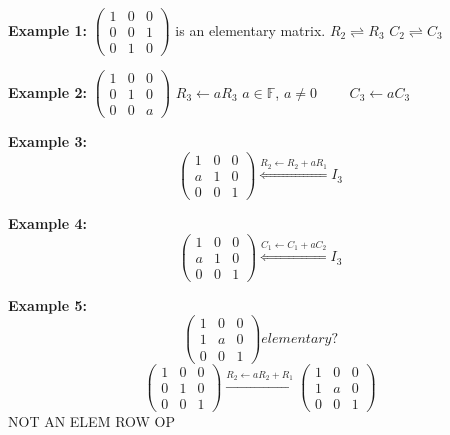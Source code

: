 \documentclass[12pt]{article}
\theoremstyle{plain}
\newcommand{\mF}{{\mathbb{F}}}
\begin{document}
	{\color{Brown}
	\textbf{Example 1: }
	$\begin{pmatrix}
		1 & 0 & 0\\
		0 & 0 & 1\\
		0 & 1 & 0 
	\end{pmatrix}$ is an elementary matrix. 
	$R_2 \rightleftharpoons R_3$ $C_2 \rightleftharpoons C_3$ 
	
	\textbf{Example 2:}
	$\begin{pmatrix}
		1 & 0 & 0\\
		0 & 1 & 0\\
		0 & 0 & a 
	\end{pmatrix}$  
	$R_3 \leftarrow aR_3$ $a \in \mF$, $a \neq 0 \qquad $ 
	$C_3 \leftarrow aC_3$ 

	\textbf{Example 3:}
	\[
		\begin{pmatrix}
			1 & 0 & 0\\
			a & 1 & 0\\
			0 & 0 & 1
		\end{pmatrix}
	\overset{R_2 \leftarrow R_2 + aR_1}{\Longleftarrow} I_3
	\]
	
	\textbf{Example 4:}
	\[
		\begin{pmatrix}
			1 & 0 & 0\\
			a & 1 & 0\\
			0 & 0 & 1
		\end{pmatrix}
	\overset{C_1 \leftarrow C_1 + aC_2}{\Longleftarrow} I_3
	\]

	\textbf{Example 5:}
	\[
		\begin{pmatrix}
			1 & 0 & 0\\
			1 & a & 0\\
			0 & 0 & 1
		\end{pmatrix}
	elementary?
	\]
	\[
		\begin{pmatrix}
			1 & 0 & 0\\
			0 & 1 & 0\\
			0 & 0 & 1
		\end{pmatrix}
		\overset{R_2 \leftarrow aR_2 + R_1}{\longrightarrow}
		\begin{pmatrix}
			1 & 0 & 0\\
			1 & a & 0\\
			0 & 0 & 1
		\end{pmatrix}
	\]
	NOT AN ELEM ROW OP


	
	}
	
\end{document}
